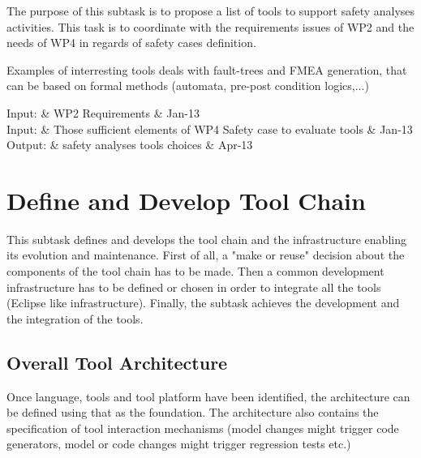 \documentclass{template/openetcs_article}
\begin{document}
The purpose of this subtask is to propose a list of tools to  support  safety  analyses activities. This task  is to  coordinate with  the requirements issues of WP2 and the needs of WP4 in regards of safety cases definition.

Examples of interresting tools deals with fault-trees and FMEA generation, that can be based on formal methods (automata, pre-post condition logics,...) 
  
 
\begin{inoutput}
Input: & WP2 Requirements & Jan-13 \\
Input: & Those sufficient elements of WP4 Safety case to evaluate tools & Jan-13 \\
\hline
Output: & safety analyses tools choices & Apr-13 \\
\end{inoutput}



\section{Define and Develop Tool Chain}\label{sec:devtoolchain}


This 
subtask defines and develops the tool chain and the infrastructure enabling its evolution and maintenance. First of all, a "make or reuse" decision about the components of the tool chain has to be made. Then a common development infrastructure has to be defined or chosen in order to integrate all the tools (Eclipse like infrastructure). Finally, the subtask achieves the development and the integration of the tools.

\subsection{Overall Tool Architecture}

Once language, tools and tool platform have been identified, the architecture can be defined using that as the foundation.  The architecture also contains the specification of tool interaction mechanisms (model changes might trigger code generators, model or code changes might trigger regression tests etc.) 
\end{document}

